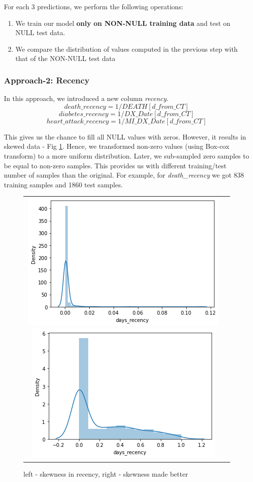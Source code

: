 For each 3 predictions, we perform the following operations:
\begin{enumerate}
    \item We train our model \textbf{only on NON-NULL training data} and test on NULL test data.
    \item We compare the distribution of values computed in the previous step with that of the NON-NULL test data
\end{enumerate}

\subsubsection{Approach-2: Recency}
In this approach, we introduced a new column \textit{recency}.
\[ death\_recency = 1 / DEATH[d\_from\_ CT]  \]
\[ diabetes\_recency = 1 /  DX\_Date[d\_from\_ CT]  \]
\[ heart\_attack\_recency = 1 / MI\_DX\_Date[d\_from\_ CT]  \]

This gives us the chance to fill all NULL values with zeros. However, it results in skewed data - Fig \ref{fig:recency_skewness_before_after_fix}. Hence, we transformed non-zero values (using Box-cox transform) to a more uniform distribution. Later, we sub-sampled zero samples to be equal to non-zero samples. This provides us with different training/test number of samples than the original. For example, for \textit{death\_recency} we got 838 training samples and 1860 test samples.

\begin{figure}[H]
	\def\imgwidth{0.5\linewidth}
	\centering
	\begin{tabular}{cc}
		\includegraphics[width=0.4\linewidth]{images/recency_skewed.png}
		\includegraphics[width=0.4\linewidth]{images/recency_fixed.png} \\
	\end{tabular}
	\caption{left - skewness in recency, right - skewness made better}
	\label{fig:recency_skewness_before_after_fix}
\end{figure}

